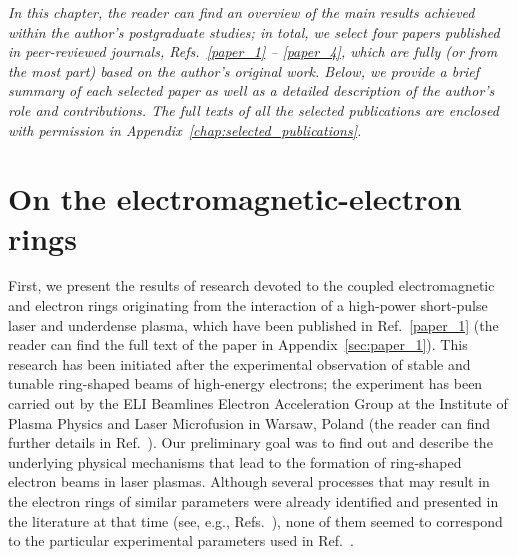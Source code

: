 \documentclass[10pt, a4paper, twoside, openright]{report}
\begin{document}
\textsl{In this chapter, the reader can find an overview of the main results achieved within the author's postgraduate studies; in total, we select four papers published in peer-reviewed journals, Refs.~\ref{paper_1} -- \ref{paper_4}, which are fully (or from the most part) based on the author's original work. Below, we provide a brief summary of each selected paper as well as a detailed description of the author's role and contributions. The full texts of all the selected publications are enclosed with permission in Appendix~\ref{chap:selected_publications}.}

\section{On the electromagnetic-electron rings\label{sec:on_the_electromagnetic-electron_rings}}
%

First, we present the results of research devoted to the coupled electromagnetic and electron rings originating from the interaction of a high-power short-pulse laser and underdense plasma, which have been published in Ref.~\ref{paper_1} (the reader can find the full text of the paper in Appendix~\ref{sec:paper_1}). This research has been initiated after the experimental observation of stable and tunable ring-shaped beams of high-energy electrons; the experiment has been carried out by the ELI Beamlines Electron Acceleration Group at the Institute of Plasma Physics and Laser Microfusion in Warsaw, Poland (the reader can find further details in Ref.~). Our preliminary goal was to find out and describe the underlying physical mechanisms that lead to the formation of ring-shaped electron beams in laser plasmas. Although several processes that may result in the electron rings of similar parameters were already identified and presented in the literature at that time (see, e.g., Refs.~), none of them seemed to correspond to the particular experimental parameters used in Ref.~.
\end{document}
